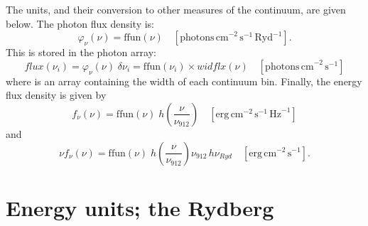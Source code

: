 The units, and their conversion to other measures of the continuum, are
given below.  The photon flux density is:
\begin{equation}
{\varphi _\nu }(\nu ) = \mathrm{ffun}(\nu )\quad [\mathrm{photons\,
cm}^{-2} \, \mathrm{s}^{-1} \, \mathrm{Ryd}^{-1}] .
\end{equation}
This is stored in the photon array:
\begin{equation}
flux({\nu _i}) = {\varphi _\nu }(\nu )\;\delta {\nu _i} = \mathrm{ffun}({\nu _i})
\times widflx(\nu )\quad [\mathrm{photons\, cm}^{-2}\, \mathrm{s}^{-1}]
\end{equation}
where  is an array containing the width of
each continuum bin.
Finally, the energy flux density is given by
\begin{equation}
{f_\nu }(\nu ) = {\mathrm{ffun}}(\nu )\;h\left( {\frac{\nu }{{{\nu _{912}}}}}
\right)\quad
 [\mathrm{erg\, cm}^{-2}\, \mathrm{s}^{-1}\, \mathrm{Hz}^{-1}]
\end{equation}
and
\begin{equation}
\nu {f_\nu }(\nu ) = {\mathrm{ffun}}(\nu )\;h\left( {\frac{\nu }{{{\nu
_{912}}}}} \right){\nu _{912}}\,h{\nu _{Ryd}}\quad
[\mathrm{erg\, cm}^{-2}\, \mathrm{s}^{-1}].
\end{equation}

\section{Energy units; the Rydberg}

